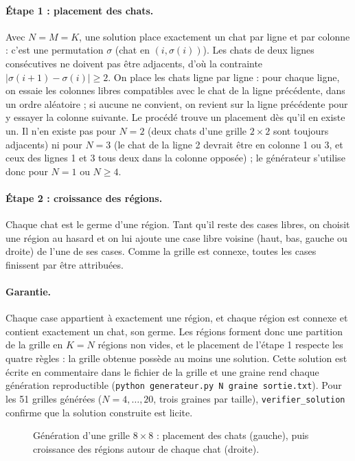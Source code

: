 \documentclass[11pt,a4paper]{article}
\begin{document}
\paragraph{Étape 1 : placement des chats.} Avec $N=M=K$, une solution place exactement un chat
par ligne et par colonne : c'est une permutation $\sigma$ (chat en $(i,\sigma(i))$). Les chats de
deux lignes consécutives ne doivent pas être adjacents, d'où la contrainte
$|\sigma(i+1)-\sigma(i)|\ge2$. On place les chats ligne par ligne : pour chaque ligne, on essaie les
colonnes libres compatibles avec le chat de la ligne précédente, dans un ordre aléatoire ; si
aucune ne convient, on revient sur la ligne précédente pour y essayer la colonne suivante. Le
procédé trouve un placement dès qu'il en existe un. Il n'en existe pas pour $N=2$ (deux chats
d'une grille $2\times2$ sont toujours adjacents) ni pour $N=3$ (le chat de la ligne 2 devrait être
en colonne 1 ou 3, et ceux des lignes 1 et 3 tous deux dans la colonne opposée) ; le générateur
s'utilise donc pour $N=1$ ou $N\ge4$.

\paragraph{Étape 2 : croissance des régions.} Chaque chat est le germe d'une région. Tant qu'il
reste des cases libres, on choisit une région au hasard et on lui ajoute une case libre voisine
(haut, bas, gauche ou droite) de l'une de ses cases. Comme la grille est connexe, toutes les cases
finissent par être attribuées.

\paragraph{Garantie.} Chaque case appartient à exactement une région, et chaque région est
connexe et contient exactement un chat, son germe. Les régions forment donc une partition de la
grille en $K=N$ régions non vides, et le placement de l'étape 1 respecte les quatre règles : la
grille obtenue possède au moins une solution. Cette solution est écrite en commentaire dans le
fichier de la grille et une graine rend chaque génération reproductible
(\texttt{python generateur.py N graine sortie.txt}). Pour les 51 grilles générées
($N=4,\dots,20$, trois graines par taille), \texttt{verifier\_solution} confirme que la solution
construite est licite.

\begin{figure}[h]
  \centering
  
  \caption{Génération d'une grille $8\times8$ : placement des chats (gauche), puis croissance des
  régions autour de chaque chat (droite).}
\end{figure}
\end{document}
